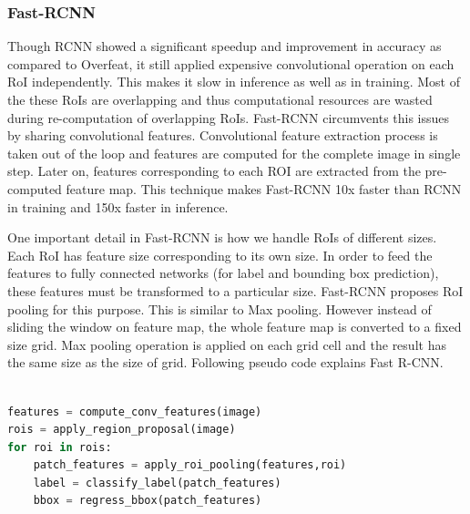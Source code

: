 \subsubsection{Fast-RCNN}
Though RCNN showed a significant speedup and improvement in accuracy as compared to Overfeat, it still applied expensive convolutional operation on each RoI independently. This makes it slow in inference as well as in training. Most of the these RoIs are overlapping and thus computational resources are wasted during re-computation of overlapping RoIs.  Fast-RCNN\cite{ref_fastrcnn} circumvents this issues by sharing convolutional features. Convolutional feature extraction process is taken out of the loop and features are computed for the complete image in single step. Later on, features corresponding to each ROI are extracted from the pre-computed feature map. This technique 
makes Fast-RCNN 10x faster than RCNN in training and 150x faster in inference.

One important detail in Fast-RCNN is how we handle RoIs of different sizes. Each RoI has feature size corresponding to its own size. In order to feed the features to fully connected networks (for label and bounding box prediction), these features must be transformed to a particular size.  Fast-RCNN proposes RoI pooling for this purpose. This is similar to Max pooling. However instead of sliding the window on feature map, the whole feature map is converted to a fixed size grid. Max pooling operation is applied on each grid cell and the result has the same size as the size of grid. Following pseudo code explains Fast R-CNN.

\begin{lstlisting}[language=Python, caption=Fast-RCNN pseudo code]

features = compute_conv_features(image)
rois = apply_region_proposal(image)
for roi in rois:
    patch_features = apply_roi_pooling(features,roi)
    label = classify_label(patch_features)
    bbox = regress_bbox(patch_features)
\end{lstlisting}




\newpage